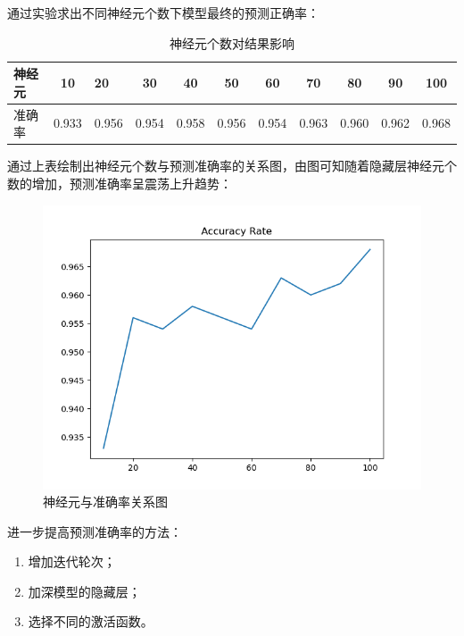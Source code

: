 \documentclass{article}
\begin{document}
通过实验求出不同神经元个数下模型最终的预测正确率：
\begin{table}[htbp]
	\centering
	\caption{\label{tab:test}神经元个数对结果影响}
	\begin{tabular}{lclcccccccc}
		\toprule    神经元 & 10 & 20& 30 & 40 & 50& 60 & 70 & 80& 90 & 100 \\
		\midrule   准确率 & 0.933 & 0.956& 0.954 & 0.958 & 0.956& 0.954 & 0.963 & 0.960& 0.962 & 0.968 \\
		\bottomrule   
	\end{tabular}  
\end{table}

通过上表绘制出神经元个数与预测准确率的关系图，由图可知随着隐藏层神经元个数的增加，预测准确率呈震荡上升趋势：
\begin{figure}[H]
	\centering
	\includegraphics[scale=0.6]{code/result.png}
	\caption{神经元与准确率关系图}
\end{figure}

进一步提高预测准确率的方法：
\begin{enumerate}[1)]
	\item 增加迭代轮次；
	\item 加深模型的隐藏层；
	\item 选择不同的激活函数。
\end{enumerate}
\end{document}
